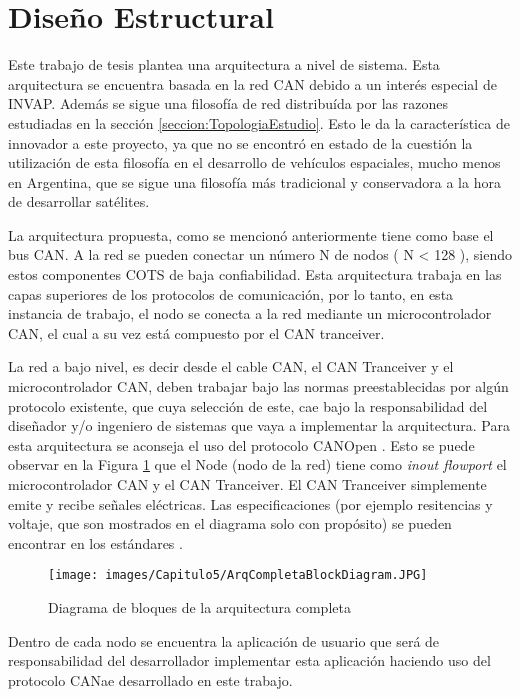 \section{Diseño Estructural}
Este trabajo de tesis plantea una arquitectura a nivel de sistema.
Esta arquitectura se encuentra basada en la red CAN debido a
un interés especial de INVAP. Además se sigue una filosofía de red
distribuída por las razones estudiadas en la sección
\ref{seccion:TopologiaEstudio}. Esto le da la característica de innovador
a este proyecto, ya que no se encontró en estado de la cuestión
la utilización de esta filosofía en el desarrollo de vehículos
espaciales, mucho menos en Argentina, que se sigue una filosofía
más tradicional y conservadora a la hora de desarrollar satélites. 

La arquitectura propuesta, como se mencionó anteriormente tiene como
base el bus CAN. A la red se pueden conectar un número N de
nodos ( N < 128 ), siendo estos componentes COTS de baja confiabilidad. 
Esta arquitectura trabaja en las capas superiores 
de los protocolos de comunicación, por lo tanto, en esta instancia 
de trabajo, el nodo se conecta a la red mediante un microcontrolador 
CAN, el cual a su vez está compuesto por el CAN tranceiver.

La red a bajo nivel, es decir desde el cable CAN, el CAN Tranceiver y 
el microcontrolador CAN, deben trabajar bajo las normas preestablecidas
por algún protocolo existente, que cuya selección de este, cae bajo la 
responsabilidad del diseñador y/o ingeniero de sistemas que vaya 
a implementar la arquitectura. Para esta arquitectura se aconseja el uso
del protocolo CANOpen \citep{can-ciaWEB}. Esto se puede observar en la
 Figura \ref{fig:DiagramaEstructuraCompleta} que el Node (nodo de la red)
tiene como \textit{inout flowport} el microcontrolador CAN  y el
CAN Tranceiver. El CAN Tranceiver simplemente emite y recibe señales eléctricas. Las 
especificaciones (por ejemplo resitencias y voltaje, que son mostrados en el diagrama
solo con propósito) se pueden encontrar en los estándares \citep{can-ciaWEB}.

\begin{figure}[h!]
 \centering
 \texttt{[image: images/Capitulo5/ArqCompletaBlockDiagram.JPG]}
  \caption{Diagrama de bloques de la arquitectura completa}
\label{fig:DiagramaEstructuraCompleta}
\end{figure} 

Dentro de cada nodo se encuentra la aplicación de usuario que será de 
responsabilidad del desarrollador implementar esta aplicación haciendo uso
del protocolo CANae desarrollado en este trabajo.

